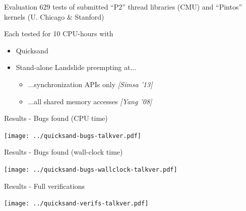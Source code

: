 \documentclass[xcolor=dvipsnames]{beamer}
\begin{document}
\begin{frame}{Evaluation}
	629 tests of submitted ``P2'' thread libraries (CMU) and ``Pintos'' kernels (U. Chicago \& Stanford)
	\linegap


	Each tested for 10 CPU-hours with
	\begin{itemize}
		\item Quicksand %
		\item Stand-alone Landslide %
			preempting at...
			\begin{itemize}
				\item ...synchronization APIs only {\em [Simsa '13]}
				\item ...all shared memory accesses
					{\em [Yang '08]} %
			\end{itemize}
	\end{itemize}
\end{frame}

\begin{frame}{Results - Bugs found (CPU time)}
	\begin{center}
		\texttt{[image: ../quicksand-bugs-talkver.pdf]}
	\end{center}
\end{frame}
\begin{frame}{Results - Bugs found (wall-clock time)}
	\begin{center}
		\texttt{[image: ../quicksand-bugs-wallclock-talkver.pdf]}
	\end{center}
\end{frame}
\begin{frame}{Results - Full verifications}
	\begin{center}
		\texttt{[image: ../quicksand-verifs-talkver.pdf]}
	\end{center}
\end{frame}
\end{document}
